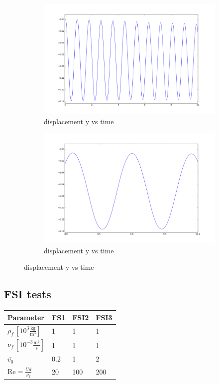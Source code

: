 \begin{figure}[!ht]
\begin{subfigure}[b]{0.5\linewidth}
\includegraphics[width=\linewidth]{figures/CSM3/CSM3_Y_full}\caption{displacement y vs time}
\end{subfigure}
\begin{subfigure}[b]{0.5\linewidth}
\includegraphics[width=\linewidth]{figures/CSM3/CSM3_2_y}\caption{displacement y vs time}
\end{subfigure}
\end{figure}
\clearpage
\subsection{FSI tests}

\begin{table}[!h]
\begin{center}
  \begin{tabular}{|l | l | l | l|} \hline
	Parameter & FS1 & FSI2 & FSI3 \\ \hline
    $\rho_f\, [10^3\frac{\text{kg}}{\text{m}^3}]$  & 1 & 1 & 1 \\   \hline
    $\nu_f\, [10^{-3}\frac{\text{m}^2}{\text{s}}]$ & 1 & 1 & 1 \\ \hline
    $\bar{v_0}$ & 0.2 & 1 & 2   \\ \hline \hline
    $\text{Re} = \frac{Ud}{\nu_f}$ & 20 & 100 & 200 \\ \hline
    \hline
  \end{tabular}
\end{center}
\end{table}

